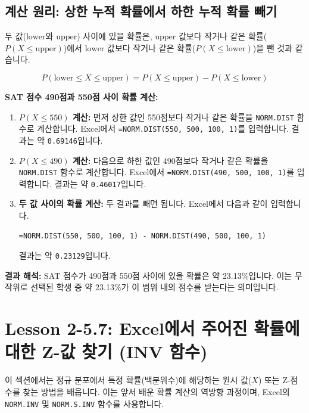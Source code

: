 \documentclass[11pt,a4paper]{book}
\providecommand{\newsection}{\section}
\theoremstyle{definition}
\begin{document}
\subsection{계산 원리: 상한 누적 확률에서 하한 누적 확률 빼기}
두 값($\text{lower}$와 $\text{upper}$) 사이에 있을 확률은, $\text{upper}$ 값보다 작거나 같은 확률($P(X \le \text{upper})$)에서 $\text{lower}$ 값보다 작거나 같은 확률($P(X \le \text{lower})$)을 뺀 것과 같습니다.

\begin{equation*}
    P(\text{lower} \le X \le \text{upper}) = P(X \le \text{upper}) - P(X \le \text{lower})
\end{equation*}

\begin{examplebox}
    \textbf{SAT 점수 490점과 550점 사이 확률 계산:}
    \begin{enumerate}
        \item \textbf{$P(X \le 550)$ 계산:}
        먼저 상한 값인 550점보다 작거나 같은 확률을 \texttt{NORM.DIST} 함수로 계산합니다.
        Excel에서 \texttt{=NORM.DIST(550, 500, 100, 1)}를 입력합니다.
        결과는 약 \texttt{0.69146}입니다.

        \item \textbf{$P(X \le 490)$ 계산:}
        다음으로 하한 값인 490점보다 작거나 같은 확률을 \texttt{NORM.DIST} 함수로 계산합니다.
        Excel에서 \texttt{=NORM.DIST(490, 500, 100, 1)}를 입력합니다.
        결과는 약 \texttt{0.46017}입니다.

        \item \textbf{두 값 사이의 확률 계산:}
        두 결과를 빼면 됩니다. Excel에서 다음과 같이 입력합니다.
        \begin{lstlisting}[language=Excel, caption={Excel에서 '두 값 사이' 확률 계산 예시}, label={lst:norm_dist_between_values}]
=NORM.DIST(550, 500, 100, 1) - NORM.DIST(490, 500, 100, 1)
        \end{lstlisting}
        결과는 약 \texttt{0.23129}입니다.
    \end{enumerate}

    \textbf{결과 해석:}
    SAT 점수가 490점과 550점 사이에 있을 확률은 약 23.13\%입니다.
    이는 무작위로 선택된 학생 중 약 23.13\%가 이 범위 내의 점수를 받는다는 의미입니다.
\end{examplebox}

\newsection{Lesson 2-5.7: Excel에서 주어진 확률에 대한 Z-값 찾기 (INV 함수)}

이 섹션에서는 정규 분포에서 특정 확률(백분위수)에 해당하는 원시 값($X$) 또는 Z-점수를 찾는 방법을 배웁니다.
이는 앞서 배운 확률 계산의 역방향 과정이며, Excel의 \texttt{NORM.INV} 및 \texttt{NORM.S.INV} 함수를 사용합니다.
\end{document}
